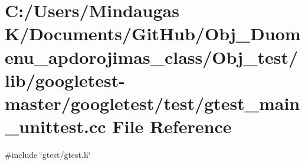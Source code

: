 \hypertarget{_obj__test_2lib_2googletest-master_2googletest_2test_2gtest__main__unittest_8cc}{}\section{C\+:/\+Users/\+Mindaugas K/\+Documents/\+Git\+Hub/\+Obj\+\_\+\+Duomenu\+\_\+apdorojimas\+\_\+class/\+Obj\+\_\+test/lib/googletest-\/master/googletest/test/gtest\+\_\+main\+\_\+unittest.cc File Reference}
\label{_obj__test_2lib_2googletest-master_2googletest_2test_2gtest__main__unittest_8cc}
{\ttfamily \#include \char`\"{}gtest/gtest.\+h\char`\"{}}\newline

